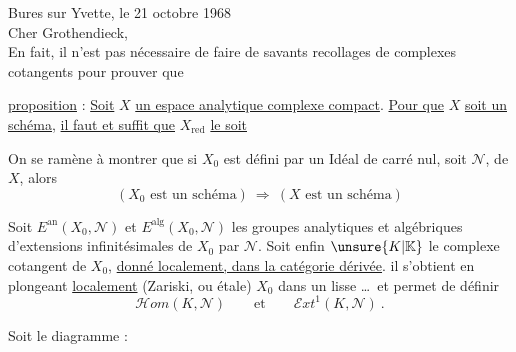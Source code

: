 \reversemarginpar{}\normalmarginpar
\noindent\hfill Bures sur Yvette, le 21 octobre 1968\\

\noindent Cher Grothendieck,\\

En fait, il n'est pas nécessaire de faire de savants recollages de complexes cotangents pour prouver que

\noindent \uline{proposition} : \uline{Soit} \(X\) \uline{un espace analytique complexe compact}. \uline{Pour que} \(X\) \uline{soit un schéma}, \uline{il faut et suffit que} \(X_{\mathrm{red}}\) \uline{le soit}

On se ramène à  montrer que si \(X_0\) est défini par un Idéal de carré nul, soit \(\mathscr{N}\), de \(X\), alors
\[
 (X_0\text{ est un schéma})\ \Longrightarrow\ (X\text{ est un schéma})
\]

Soit \(E^{\mathrm{an}}(X_0,\mathscr{N})\) et \(E^{\mathrm{alg}}(X_0,\mathscr{N})\) les groupes analytiques et algébriques d'extensions infinitésimales de \(X_0\) par \(\mathscr{N}\). Soit enfin \(\unsure{K|\mathbb{K}}\) le complexe cotangent de \(X_0\), \uline{donné localement, dans la catégorie dérivée}. il s'obtient en plongeant \uline{localement} (Zariski, ou étale) \(X_0\) dans un  lisse \ldots\ et permet de définir
\begingroup
\makeatletter\tagsleft@true\makeatother
\[
 \mathscr{H}om(K,\mathscr{N})\qquad\text{et}\qquad\mathscr{E}xt^{1}(K,\mathscr{N})\ .\tag*{(1)}
\]
\endgroup

Soit le diagramme :


